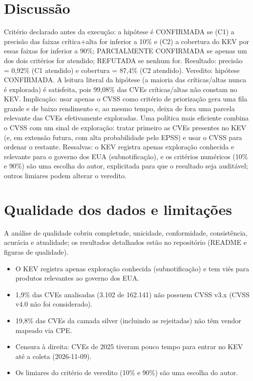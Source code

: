 \documentclass[11pt,a4paper]{article}
\begin{document}
\section{Discussão}
Critério declarado antes da execução: a hipótese é CONFIRMADA se (C1) a precisão das faixas crítica+alta for inferior a 10\% e (C2) a cobertura do KEV por essas faixas for inferior a 90\%; PARCIALMENTE CONFIRMADA se apenas um dos dois critérios for atendido; REFUTADA se nenhum for. Resultado: precisão = 0,92\% (C1 atendido) e cobertura = 87,4\% (C2 atendido). Veredito: hipótese CONFIRMADA. A leitura literal da hipótese (a maioria das críticas/altas nunca é explorada) é satisfeita, pois 99,08\% das CVEs críticas/altas não constam no KEV. Implicação: usar apenas o CVSS como critério de priorização gera uma fila grande e de baixo rendimento e, ao mesmo tempo, deixa de fora uma parcela relevante das CVEs efetivamente exploradas. Uma política mais eficiente combina o CVSS com um sinal de exploração: tratar primeiro as CVEs presentes no KEV (e, em extensão futura, com alta probabilidade pelo EPSS) e usar o CVSS para ordenar o restante. Ressalvas: o KEV registra apenas exploração conhecida e relevante para o governo dos EUA (subnotificação), e os critérios numéricos (10\% e 90\%) são uma escolha do autor, explicitada para que o resultado seja auditável; outros limiares podem alterar o veredito.

\section{Qualidade dos dados e limitações}
A análise de qualidade cobriu completude, unicidade, conformidade, consistência, acurácia e atualidade; os resultados detalhados estão no repositório (README e figuras de qualidade).
\begin{itemize}
\item O KEV registra apenas exploração conhecida (subnotificação) e tem viés para produtos relevantes ao governo dos EUA.
\item 1,9\% das CVEs analisadas (3.102 de 162.141) não possuem CVSS v3.x (CVSS v4.0 não foi considerado).
\item 19,8\% das CVEs da camada silver (incluindo as rejeitadas) não têm vendor mapeado via CPE.
\item Censura à direita: CVEs de 2025 tiveram pouco tempo para entrar no KEV até a coleta (2026-11-09).
\item Os limiares do critério de veredito (10\% e 90\%) são uma escolha do autor.
\end{itemize}
\end{document}
